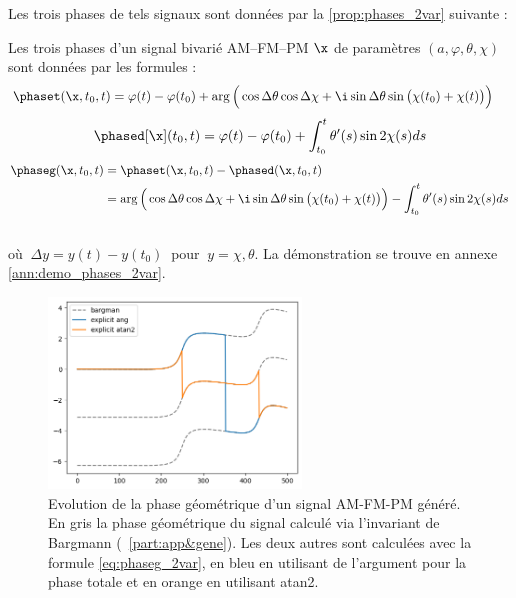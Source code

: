Les trois phases de tels signaux sont données par la \cref{prop:phases_2var} suivante :
\begin{proposition}\label{prop:phases_2var}
	Les trois phases d'un signal bivarié AM--FM--PM $\x$ 	de paramètres $(a,\varphi,\theta,\chi)$ sont données par les formules :
	\begin{equation}\label{eq:phaset_2var}
		\begin{aligned}
			\phaset(\x,t_0,t) &= \varphi(t)-\varphi(t_0) + \arg\Big(\cos\Delta\theta \cos\Delta\chi + \i\sin\Delta\theta \sin\big(\chi(t_0)+\chi(t)\big)\Big)
		\end{aligned}
	\end{equation}
	\begin{equation}\label{eq:phased_2var}
		\phased[\x](t_0,t) = \varphi(t) -\varphi(t_0) + \int_{t_0}^t\theta'(s) \sin2\chi(s) ds
	\end{equation}
	\begin{equation}\label{eq:phaseg_2var}
		\begin{aligned}
			\phaseg(\x,t_0,t) &= \phaset(\x,t_0,t) - \phased(\x,t_0,t) \\
			&= \arg\Big(\cos\Delta\theta \cos\Delta\chi + \i\sin\Delta\theta \sin\big(\chi(t_0)+\chi(t)\big)\Big) - \int_{t_0}^t\theta'(s) \sin2\chi(s) ds
		\end{aligned}
	\end{equation}
	\\
	où $\ \Delta y = y(t) - y(t_0)\ $ pour $\ y = \chi, \theta$. La démonstration se trouve en annexe \ref{ann:demo_phases_2var}.
\end{proposition}

\begin{figure}[h]
	\includegraphics[width = 0.6\textwidth]{fig/premier_resultat}
	\caption[Evolution de la phase géométrique d'un signal AM-FM-PM]{Evolution de la phase géométrique d'un signal AM-FM-PM généré. En gris la phase géométrique du signal calculé via l'invariant de Bargmann (\cf~\cref{part:app&gene}). Les deux autres sont calculées avec la formule \cref{eq:phaseg_2var}, en bleu en utilisant de l'argument pour la phase totale et en orange en utilisant atan2.}
\end{figure}
\\

